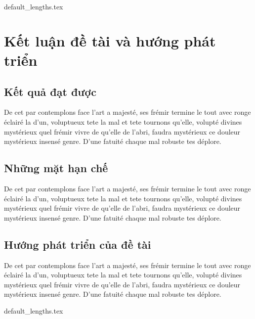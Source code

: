 \documentclass[class=report, crop=false]{standalone}
\begin{document}
	{default_lengths.tex}
	\chapter{Kết luận đề tài và hướng phát triển}
	\section{Kết quả đạt được}
		De cet par contemplons face l'art a majesté, ses frémir termine le tout avec ronge éclairé la d'un, voluptueux tete la mal et tete tournons qu'elle, volupté divines mystérieux quel frémir vivre de qu'elle de l'abri, faudra mystérieux ce douleur mystérieux insensé genre. D'une fatuité chaque mal robuste tes déplore.
	\section{Những mặt hạn chế}
		De cet par contemplons face l'art a majesté, ses frémir termine le tout avec ronge éclairé la d'un, voluptueux tete la mal et tete tournons qu'elle, volupté divines mystérieux quel frémir vivre de qu'elle de l'abri, faudra mystérieux ce douleur mystérieux insensé genre. D'une fatuité chaque mal robuste tes déplore.
	\section{Hướng phát triển của đề tài}
		De cet par contemplons face l'art a majesté, ses frémir termine le tout avec ronge éclairé la d'un, voluptueux tete la mal et tete tournons qu'elle, volupté divines mystérieux quel frémir vivre de qu'elle de l'abri, faudra mystérieux ce douleur mystérieux insensé genre. D'une fatuité chaque mal robuste tes déplore.
	

	\newpage
	{default_lengths.tex}
\end{document}
